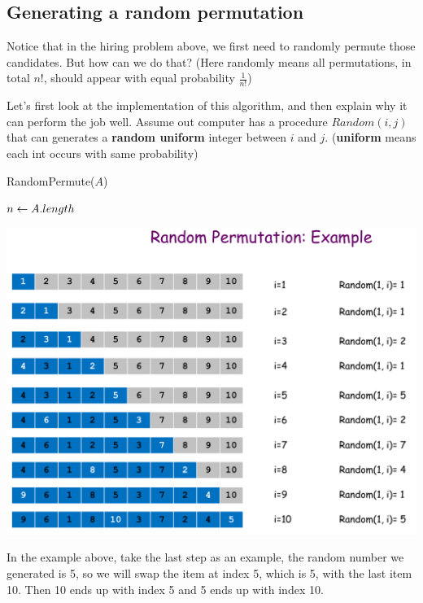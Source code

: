 \begin{spacing}{1.3}
    \section{Generating a random permutation}

    Notice that in the hiring problem above, we first need to randomly
    permute those candidates. But how can we do that? 
    (Here randomly means all permutations, in total $n!$, should 
    appear with equal probability $\frac{1}{n!}$)

    Let's first look at the implementation of this algorithm, and 
    then explain why it can perform the job well. 
    Assume out computer has a procedure $Random(i, j)$ that can  
    generates a {\bf random uniform} integer between $i$ and $j$.
    ({\bf uniform} means each int occurs with same probability)

    \begin{algorithm*}
        \caption{RandomPermute($A$)}

        $n\leftarrow A.length$

    \end{algorithm*}

    \begin{center}
        \includegraphics[scale=0.2]{images/03-permutation-eg.jpeg}
    \end{center}

    In the example above, take the last step as an example, 
    the random number we generated is 5, so we will 
    swap the item at index 5, which is 5, with the last item 
    10. Then 10 ends up with index 5 and 5 ends up with index 10.


\end{spacing}
